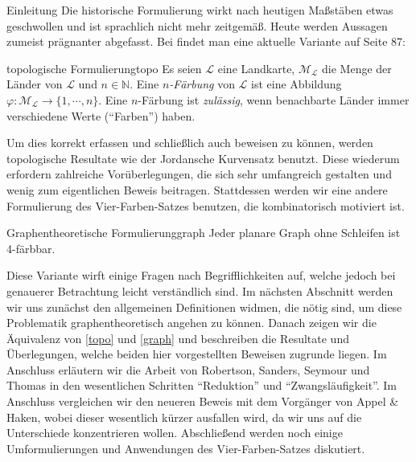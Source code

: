\begin{chapter}{Einleitung}
 Die historische Formulierung wirkt nach heutigen Maßstäben etwas geschwollen und ist sprachlich nicht mehr zeitgemäß. Heute werden Aussagen zumeist prägnanter abgefasst. Bei \cite{fritsch} findet man eine aktuelle Variante auf Seite 87:  
 
 \begin{satzl}{topologische Formulierung}{topo}
  Es seien $\mathcal{L}$ eine Landkarte, $\mathcal{M}_\mathcal{L}$ die Menge der Länder von $\mathcal{L}$ und $n \in \mathbb{N}$. Eine \textit{$n$-Färbung} von $\mathcal{L}$ ist eine Abbildung $\varphi: \mathcal{M}_{\mathcal{L}} \rightarrow \{1,\cdots,n\}$. Eine $n$-Färbung ist \textit{zulässig}, wenn benachbarte Länder immer verschiedene Werte (``Farben'') haben.
 \end{satzl}

 Um dies korrekt erfassen und schließlich auch beweisen zu können, werden topologische Resultate wie der Jordansche Kurvensatz benutzt. Diese wiederum erfordern zahlreiche Vorüberlegungen, die sich sehr umfangreich gestalten und wenig zum eigentlichen Beweis beitragen. Stattdessen werden wir eine andere Formulierung des Vier-Farben-Satzes benutzen, die kombinatorisch motiviert ist. 
 
 \begin{satzl}{Graphentheoretische Formulierung}{graph}
  Jeder planare Graph ohne Schleifen ist 4-färbbar.
 \end{satzl}
 
 Diese Variante wirft einige Fragen nach Begrifflichkeiten auf, welche jedoch bei genauerer Betrachtung leicht verständlich sind. Im nächsten Abschnitt werden wir uns zunächst den allgemeinen Definitionen widmen, die nötig sind, um diese Problematik graphentheoretisch angehen zu können. Danach zeigen wir die Äquivalenz von \ref{topo} und \ref{graph} und beschreiben die Resultate und Überlegungen, welche beiden hier vorgestellten Beweisen zugrunde liegen. Im Anschluss erläutern wir die Arbeit von Robertson, Sanders, Seymour und Thomas in den wesentlichen Schritten ``Reduktion'' und ``Zwangsläufigkeit''. Im Anschluss vergleichen wir den neueren Beweis mit dem Vorgänger von Appel \& Haken, wobei dieser wesentlich kürzer ausfallen wird, da wir uns auf die Unterschiede konzentrieren wollen. Abschließend werden noch einige Umformulierungen und Anwendungen des Vier-Farben-Satzes diskutiert.
\end{chapter}